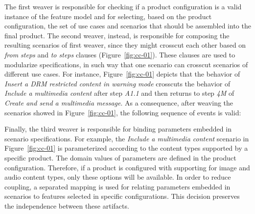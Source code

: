 \documentclass{acm_proc_article-sp}
\begin{document}
The first weaver is responsible for checking if a product configuration is a valid instance of the feature model and for selecting, based on the product configuration, the set of use cases and scenarios that should be assembled into the final product. The second weaver, instead, is responsible for composing the resulting scenarios of first weaver, since they might crosscut each other based on \emph{from steps} and \emph{to steps} clauses (Figure~\ref{fig:cc-01}). These clauses are used to modularize specifications, in such way that one scenario can crosscut scenarios of different use cases. For instance, Figure~\ref{fig:cc-01} depicts that the behavior of \emph{Insert a DRM restricted content in warning mode} crosscuts the behavior of \emph{Include a multimedia content} after step \emph{A1.1} and then returns to step \emph{4M} of \emph{Create and send a multimedia message}.  As a consequence, after weaving the scenarios showed in Figure~\ref{fig:cc-01}, the following sequence of events is valid:

\begin{center}
\small{
}
\end{center}

Finally, the third weaver is responsible for binding parameters embedded in scenario specifications. For example, the \emph{Include a multimedia content} scenario in Figure~\ref{fig:cc-01} is parameterized according to the content types supported by a specific product. The domain values of parameters are defined in the product configuration. Therefore, if a product is configured with supporting for image and audio content types, only these options will be available.  In order to reduce coupling, a separated mapping is used for relating parameters embedded in scenarios to features selected in specific configurations. This decision preserves the independence between these artifacts.
\end{document}
